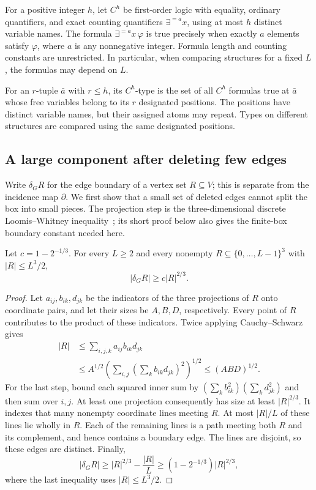 For a positive integer $h$, let $C^h$ be first-order logic with equality,
ordinary quantifiers, and exact counting quantifiers
$\exists^{=a}x$, using at most $h$ distinct variable names.  The formula
$\exists^{=a}x\,\varphi$ is true precisely when exactly $a$ elements
satisfy $\varphi$, where $a$ is any nonnegative integer.  Formula length
and counting constants are unrestricted.  In particular, when comparing
structures for a fixed $L$, the formulas may depend on $L$.

For an $r$-tuple $\bar a$ with $r\le h$, its $C^h$-type is the set of
all $C^h$ formulas true at $\bar a$ whose free variables belong to its
$r$ designated positions.  The positions have distinct variable names,
but their assigned atoms may repeat.  Types on different structures are
compared using the same designated positions.

\subsection{A large component after deleting few edges}

Write $\delta_G R$ for the edge boundary of a vertex set $R\subseteq V$;
this is separate from the incidence map $\partial$.  We first show that
a small set of deleted edges cannot split the box into small pieces.
The projection step is the three-dimensional discrete Loomis--Whitney
inequality~\cite{loomisWhitney1949}; its short proof below
also gives the finite-box boundary constant needed here.

\begin{lemma}
\label{base:boundary}
Let $c=1-2^{-1/3}$.  For every $L\ge2$ and every nonempty
$R\subseteq\{0,\ldots,L-1\}^3$ with $|R|\le L^3/2$,
\[
 |\delta_G R|\ge c|R|^{2/3}.
\]
\end{lemma}
\begin{proof}
Let $a_{ij},b_{ik},d_{jk}$ be the indicators of the three projections of
$R$ onto coordinate pairs, and let their sizes be $A,B,D$, respectively.
Every point of $R$ contributes to the product of these indicators.
Twice applying Cauchy--Schwarz gives
\begin{align*}
 |R|
 &\le\sum_{i,j,k}a_{ij}b_{ik}d_{jk}\\
 &\le A^{1/2}
      \left(\sum_{i,j}\left(\sum_k b_{ik}d_{jk}\right)^2\right)^{1/2}
 \le (ABD)^{1/2}.
\end{align*}
For the last step, bound each squared inner sum by
$(\sum_k b_{ik}^2)(\sum_k d_{jk}^2)$ and then sum over $i,j$.
At least one projection consequently has size at least $|R|^{2/3}$.
It indexes that many nonempty coordinate lines meeting $R$.  At most
$|R|/L$ of these lines lie wholly in $R$.  Each of the remaining lines
is a path meeting both $R$ and its complement, and hence contains a
boundary edge.  The lines are disjoint, so these edges are distinct.
Finally,
\[
 |\delta_G R|\ge |R|^{2/3}-\frac{|R|}{L}
 \ge (1-2^{-1/3})|R|^{2/3},
\]
where the last inequality uses $|R|\le L^3/2$.
\end{proof}

